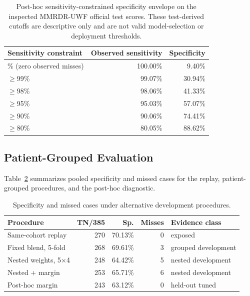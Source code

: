 \documentclass{ieeeaccess}
\begin{document}
\begin{table}[t]
\centering
\caption{Post-hoc sensitivity-constrained specificity envelope on the inspected MMRDR-UWF official test scores. These test-derived cutoffs are descriptive only and are not valid model-selection or deployment thresholds.}
\label{tab:mmrdr-posthoc-frontier}
\small
\begin{tabularx}{\columnwidth}{>{\raggedright\arraybackslash}Xrr}
\toprule
Sensitivity constraint & Observed sensitivity & Specificity \\
\midrule
100\% (zero observed misses) & 100.00\% & 9.40\% \\
$\geq$99\% & 99.07\% & 30.94\% \\
$\geq$98\% & 98.06\% & 41.33\% \\
$\geq$95\% & 95.03\% & 57.07\% \\
$\geq$90\% & 90.06\% & 74.41\% \\
$\geq$80\% & 80.05\% & 88.62\% \\
\bottomrule
\end{tabularx}
\end{table}

\subsection{Patient-Grouped Evaluation}
Table~\ref{tab:cv} summarizes pooled specificity and missed cases for the replay, patient-grouped procedures, and the post-hoc diagnostic.
\begin{table}[t]
\centering
\caption{Specificity and missed cases under alternative development procedures.}
\label{tab:cv}
\small
\setlength{\tabcolsep}{3pt}
\begin{tabularx}{\columnwidth}{>{\raggedright\arraybackslash}Xrrr>{\raggedright\arraybackslash}p{}}
\toprule
Procedure & TN/385 & Sp. & Misses & Evidence class \\
\midrule
Same-cohort replay & 270 & 70.13\% & 0 & exposed \\
Fixed blend, 5-fold & 268 & 69.61\% & 3 & grouped development \\
Nested weights, 5$\times$4 & 248 & 64.42\% & 5 & nested development \\
Nested + margin & 253 & 65.71\% & 6 & nested development \\
Post-hoc margin & 243 & 63.12\% & 0 & held-out tuned \\
\bottomrule
\end{tabularx}
\end{table}
\end{document}
